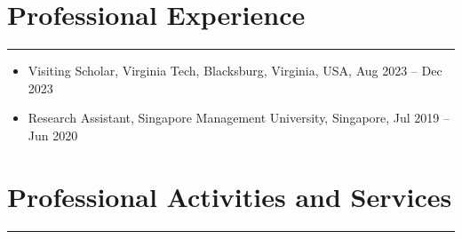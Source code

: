 \documentclass[12pt, a4paper]{article}
\begin{document}
{\begin{itemize}[leftmargin=14pt]
\end{itemize}



\section*{Professional Experience}
\vspace*{4pt}
\hrule

\begin{itemize}[leftmargin=30pt, itemsep=0pt]
    \item Visiting Scholar, Virginia Tech, Blacksburg, Virginia, USA, Aug 2023 -- Dec 2023	
    \item Research Assistant, Singapore Management University, Singapore, Jul 2019 -- Jun 2020
\end{itemize}




\section*{Professional Activities and Services}
\vspace*{4pt}
\hrule

}
\end{document}
